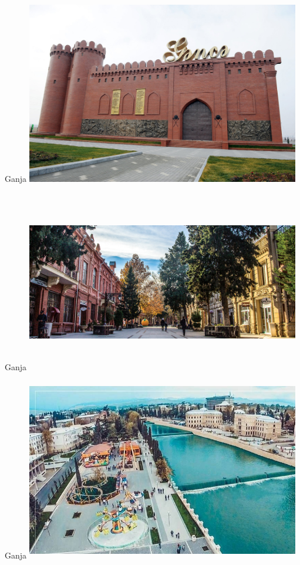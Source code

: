 \documentclass[hyperref={pdfpagemode=FullScreen}]{beamer}
\begin{document}
\begin{frame}{Ganja}
\includegraphics[width=12cm, height=8cm]{img/gence01.jpg}
\end{frame}

\begin{frame}{Ganja}
\includegraphics[width=12cm, height=8cm]{img/gence02.jpg}
\end{frame}

\begin{frame}{Ganja}
\includegraphics[width=12cm, height=8cm]{img/gence03.jpg}
\end{frame}
\end{document}
